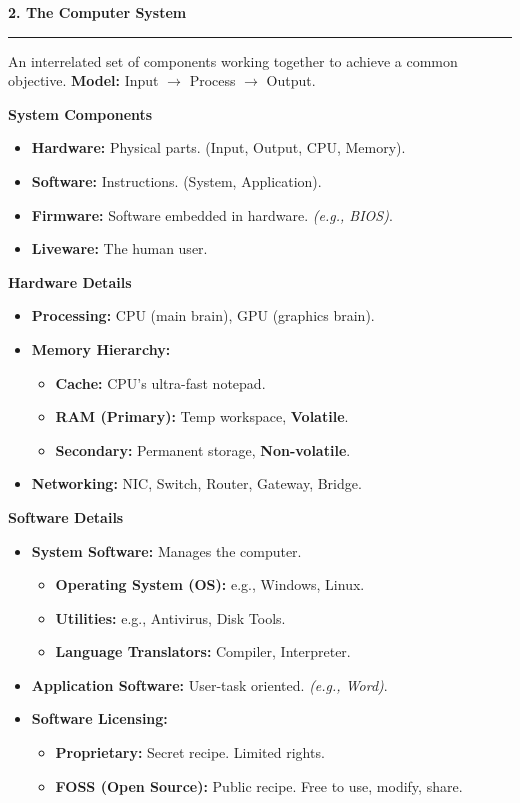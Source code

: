 \documentclass[a4paper, 8pt]{extarticle}
\newcommand{\sectionheading}[1]{\large\textbf{#1}\par\noindent\rule{\linewidth}{0.4pt}}
\newcommand{\subsectionheading}[1]{\normalsize\textbf{#1}}
\begin{document}
\begin{multicols}{2}
\vspace{1em}
\sectionheading{2. The Computer System}
\vspace{0.5em}
\begin{tcolorbox}[title=\textbf{System Definition}]
An interrelated set of components working together to achieve a common objective. \textbf{Model:} Input $\rightarrow$ Process $\rightarrow$ Output.
\end{tcolorbox}
\subsectionheading{System Components}
\begin{itemize}
    \item \textbf{Hardware:} Physical parts. (Input, Output, CPU, Memory).
    \item \textbf{Software:} Instructions. (System, Application).
    \item \textbf{Firmware:} Software embedded in hardware. \textit{(e.g., BIOS)}.
    \item \textbf{Liveware:} The human user.
\end{itemize}
\subsectionheading{Hardware Details}
\begin{itemize}
    \item \textbf{Processing:} CPU (main brain), GPU (graphics brain).
    \item \textbf{Memory Hierarchy:}
        \begin{itemize}
            \item \textbf{Cache:} CPU's ultra-fast notepad.
            \item \textbf{RAM (Primary):} Temp workspace, \textbf{Volatile}.
            \item \textbf{Secondary:} Permanent storage, \textbf{Non-volatile}.
        \end{itemize}
    \item \textbf{Networking:} NIC, Switch, Router, Gateway, Bridge.
\end{itemize}
\subsectionheading{Software Details}
\begin{itemize}
    \item \textbf{System Software:} Manages the computer.
        \begin{itemize}
            \item \textbf{Operating System (OS):} e.g., Windows, Linux.
            \item \textbf{Utilities:} e.g., Antivirus, Disk Tools.
            \item \textbf{Language Translators:} Compiler, Interpreter.
        \end{itemize}
    \item \textbf{Application Software:} User-task oriented. \textit{(e.g., Word)}.
    \item \textbf{Software Licensing:}
        \begin{itemize}
            \item \textbf{Proprietary:} Secret recipe. Limited rights.
            \item \textbf{FOSS (Open Source):} Public recipe. Free to use, modify, share.
        \end{itemize}
\end{itemize}


\end{multicols}
\end{document}
